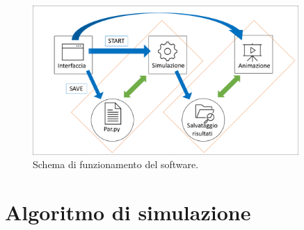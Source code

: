 \documentclass[12pt]{report}
\begin{document}
\begin{figure}
    \centering
    \includegraphics[width = 0.9\textwidth]{immagini/schema.pdf}
    \caption{ \textcolor{dark-gray}{Schema di funzionamento del software.}}
    \label{fig:schema}
\end{figure}

\section{Algoritmo di simulazione}
\label{sec:ev_code} 
\end{document}
